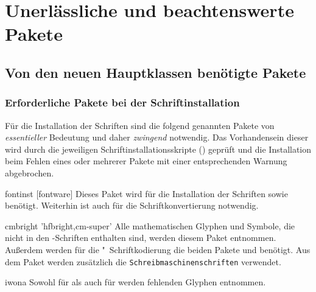 \chapter{Unerlässliche und beachtenswerte Pakete}
\section{Von den neuen Hauptklassen benötigte Pakete}
\label{sec:packages:needed}
\subsection{Erforderliche Pakete bei der Schriftinstallation}
%
Für die Installation der Schriften sind die folgend genannten Pakete von
\emph{essentieller} Bedeutung und daher \emph{zwingend} notwendig. Das 
Vorhandensein dieser wird durch die jeweiligen Schriftinstallationsskripte
() geprüft und die Installation beim Fehlen eines 
oder mehrerer Pakete mit einer entsprechenden Warnung abgebrochen.
%
\begin{packages}
\item[fontinst][fontware]
  Dieses Paket wird für die Installation der Schriften \Univers sowie \DIN 
  benötigt. Weiterhin ist auch  für die Schriftkonvertierung 
  notwendig.
\item[cmbright]'hfbright,cm-super'
  Alle mathematischen Glyphen und Symbole, die nicht in den \Univers-Schriften 
  enthalten sind, werden diesem Paket entnommen. Außerdem werden für die 
  "~Schriftkodierung die beiden Pakete  und 
   benötigt. Aus dem Paket  werden 
  zusätzlich die \texttt{Schreibmaschinenschriften} verwendet.
\item[iwona]
  Sowohl für \Univers als auch für \DIN werden fehlenden Glyphen entnommen.
\end{packages}



